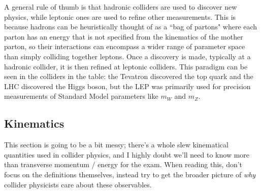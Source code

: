 \documentclass[11pt, oneside]{article}   	%
\theoremstyle{definition}
\numberwithin{equation}{subsection}		%
\begin{document}
A general rule of thumb is that hadronic colliders are used to discover new physics, while leptonic ones are used to refine other 
measurements. This is because hadrons can be heuristically thought of as a ``bag of partons" where each parton has an energy that is not 
specified from the kinematics of the mother parton, so their interactions can encompass a wider range of parameter space than simply 
colliding together leptons. Once a discovery is made, typically at a hadronic collider, it is then refined at leptonic colliders. This paradigm 
can be seen in the colliders in the table: the Tevatron discovered the top quark and the LHC discovered the Higgs boson, but the LEP was 
primarily used for precision measurements of Standard Model parameters like $m_W$ and $m_Z$. 

\subsection{Kinematics}

This section is going to be a bit messy; there's a whole slew kinematical quantities used in collider physics, and I highly doubt we'll need to 
know more than transverse momentum / energy for the exam. When reading this, don't focus on the definitions themselves, instead try to 
get the broader picture of \textit{why} collider physicists care about these observables. 
\end{document}
